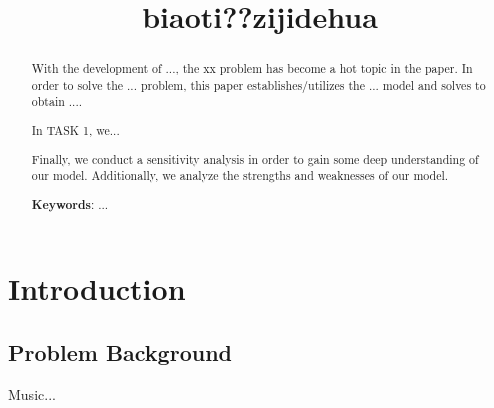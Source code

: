 \documentclass[12pt]{article}  %
\title{biaoti??zijidehua}
\newcommand{\upcite}[1]{\textsuperscript{\textsuperscript{\cite{#1}}}}
\begin{document}
	
	
	
	
	
	
	
	
	
	
	
\begin{abstract}%
	
	
	With the development of ..., the xx problem has become a hot topic in the paper. In order to solve the ... problem, this paper establishes/utilizes the
	... model and solves to obtain .... 
	
	In \textsc{TASK 1}, we...
				
	Finally, we conduct a sensitivity analysis in order to gain some deep understanding of our model. Additionally, we analyze the strengths and weaknesses of our model.
	
	
	\vspace{5pt}
	\textbf{Keywords}: ...%
	
\end{abstract}
    
\maketitle  %

\tableofcontents






















\section{Introduction}

\subsection{Problem Background}
Music...%
\upcite{ref1}%

\end{document}
